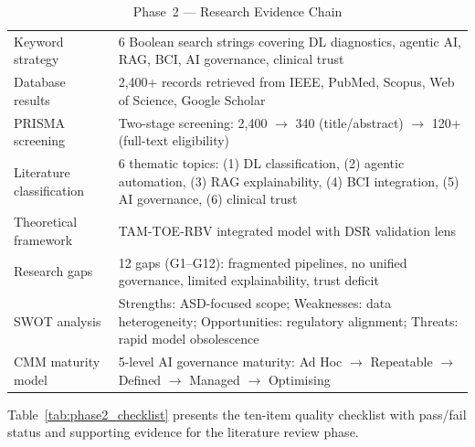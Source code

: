 \begingroup\singlespacing\tablefontsize\tablestripes
\begin{xltabular}{\textwidth}{@{} l X @{}}
\caption{Phase~2 --- Research Evidence Chain}
\label{tab:phase2_evidence}\\
\toprule
{} &  \\
\midrule
\endfirsthead
\endhead
\bottomrule
\endlastfoot
Keyword strategy             & 6 Boolean search strings covering DL diagnostics, agentic AI, RAG, BCI, AI governance, clinical trust \\
\addlinespace
Database results             & 2,400+ records retrieved from IEEE, PubMed, Scopus, Web of Science, Google Scholar \\
\addlinespace
PRISMA screening             & Two-stage screening: 2,400 $\rightarrow$ 340 (title/abstract) $\rightarrow$ 120+ (full-text eligibility) \\
\addlinespace
Literature classification    & 6 thematic topics: (1) DL classification, (2) agentic automation, (3) RAG explainability, (4) BCI integration, (5) AI governance, (6) clinical trust \\
\addlinespace
Theoretical framework        & TAM-TOE-RBV integrated model with DSR validation lens \\
\addlinespace
Research gaps                & 12 gaps (G1--G12): fragmented pipelines, no unified governance, limited explainability, trust deficit \\
\addlinespace
SWOT analysis                & Strengths: ASD-focused scope; Weaknesses: data heterogeneity; Opportunities: regulatory alignment; Threats: rapid model obsolescence \\
\addlinespace
CMM maturity model           & 5-level AI governance maturity: Ad Hoc $\rightarrow$ Repeatable $\rightarrow$ Defined $\rightarrow$ Managed $\rightarrow$ Optimising \\
\end{xltabular}
\endgroup

\vspace{1.5em}

Table~\ref{tab:phase2_checklist} presents the ten-item quality checklist with pass/fail status and supporting evidence for the literature review phase.

